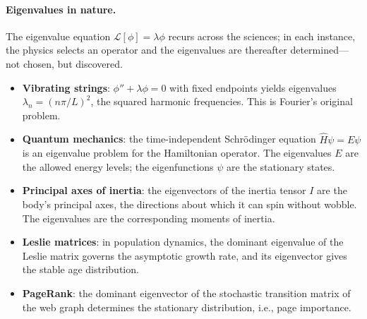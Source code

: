 \documentclass[12pt,a4paper]{report}
\theoremstyle{thms}
\theoremstyle{defns}
\begin{document}
\paragraph{Eigenvalues in nature.} The eigenvalue equation $\mathcal{L}[\phi] = \lambda\phi$ recurs across the sciences; in each instance, the physics selects an operator and the eigenvalues are thereafter determined—not chosen, but discovered.
\begin{itemize}
    \item \textbf{Vibrating strings}: $\phi'' + \lambda\phi = 0$ with fixed endpoints yields eigenvalues $\lambda_n = (n\pi/L)^2$, the squared harmonic frequencies. This is Fourier's original problem.
    \item \textbf{Quantum mechanics}: the time-independent Schr\"{o}dinger equation $\hat{H}\psi = E\psi$ is an eigenvalue problem for the Hamiltonian operator. The eigenvalues $E$ are the allowed energy levels; the eigenfunctions $\psi$ are the stationary states.
    \item \textbf{Principal axes of inertia}: the eigenvectors of the inertia tensor $I$ are the body's principal axes, the directions about which it can spin without wobble. The eigenvalues are the corresponding moments of inertia.
    \item \textbf{Leslie matrices}: in population dynamics, the dominant eigenvalue of the Leslie matrix governs the asymptotic growth rate, and its eigenvector gives the stable age distribution.
    \item \textbf{PageRank}: the dominant eigenvector of the stochastic transition matrix of the web graph determines the stationary distribution, i.e., page importance.
\end{itemize}
\end{document}
